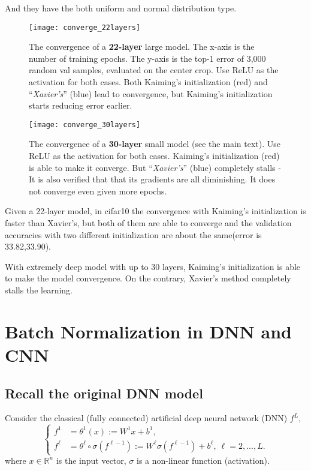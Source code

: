 And they have the both uniform and normal distribution type.
\begin{figure}[H]
	\begin{center}
		\texttt{[image: converge\_22layers]}
	\end{center}
	\caption{The convergence of a \textbf{22-layer} large model. The x-axis is the number of training epochs. The y-axis is the top-1 error of 3,000 random val samples, evaluated on the center crop. Use ReLU as the activation for both cases. Both Kaiming's initialization (red) and ``\emph{Xavier's}'' (blue) \cite{glorot2010understanding} lead to convergence, but Kaiming's initialization starts reducing error earlier.}
	\label{fig:converge_22layers}
	\begin{center}
		\texttt{[image: converge\_30layers]}
	\end{center}
	\caption{The convergence of a \textbf{30-layer} small model (see the main text). Use ReLU as the activation for both cases. Kaiming's initialization (red) is able to make it converge. But ``\emph{Xavier's}'' (blue) \cite{glorot2010understanding} completely stalls - It is also verified that that its gradients are all diminishing. It does not converge even given more epochs.}
	\label{fig:converge_30layers}
\end{figure}

Given a 22-layer model, in cifar10 the convergence with Kaiming's initialization is faster than Xavier's, 
but both of them are able to converge and the validation accuracies with two different initialization 
are about the same(error is 33.82,33.90).

With extremely deep model with up to 30 layers, 
Kaiming's initialization is able to make the model convergence. On the contrary, Xavier's method completely stalls the learning.


\section{Batch Normalization in DNN and CNN}
\subsection{Recall the original DNN model}
Consider the classical (fully connected)  artificial deep neural network (DNN) $f^L$,
\begin{equation}\label{nn}
\begin{cases}
f^1&= \theta^1 (x) := W^1 x+b^1,\\
f^\ell &= \theta^{\ell} \circ \sigma (f^{\ell-1}) :=W^\ell  \sigma (f^{\ell-1}) +b^\ell,\ \ell=2,...,L.
\end{cases}
\end{equation}
where $x\in\mathbb{R}^n$ is the input vector, $\sigma$ is a non-linear function (activation).  


